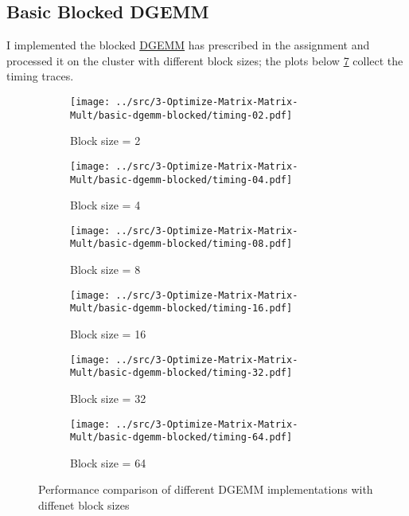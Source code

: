 
\subsection{Basic Blocked DGEMM}

I implemented the blocked \href{./../src/3-Optimize-Matrix-Matrix-Mult/dgemm-blocked.c}{DGEMM} has prescribed in the assignment and processed it on the cluster with different block sizes; the plots below \ref{fig:dgemm-performance} collect the timing traces.

\begin{figure}[h]
    \centering
    \begin{subfigure}[b]{0.48\textwidth}
        \centering
        \texttt{[image: ../src/3-Optimize-Matrix-Matrix-Mult/basic-dgemm-blocked/timing-02.pdf]}
        \caption{Block size = 2}
        \label{fig:timing-02}
    \end{subfigure}
    \hfill
    \begin{subfigure}[b]{0.48\textwidth}
        \centering
        \texttt{[image: ../src/3-Optimize-Matrix-Matrix-Mult/basic-dgemm-blocked/timing-04.pdf]}
        \caption{Block size = 4}
        \label{fig:timing-04}
    \end{subfigure}
    
    \vspace{1em}
    
    \begin{subfigure}[b]{0.48\textwidth}
        \centering
        \texttt{[image: ../src/3-Optimize-Matrix-Matrix-Mult/basic-dgemm-blocked/timing-08.pdf]}
        \caption{Block size = 8}
        \label{fig:timing-08}
    \end{subfigure}
    \hfill
    \begin{subfigure}[b]{0.48\textwidth}
        \centering
        \texttt{[image: ../src/3-Optimize-Matrix-Matrix-Mult/basic-dgemm-blocked/timing-16.pdf]}
        \caption{Block size = 16}
        \label{fig:timing-16}
    \end{subfigure}
    
    \vspace{1em}
    
    \begin{subfigure}[b]{0.48\textwidth}
        \centering
        \texttt{[image: ../src/3-Optimize-Matrix-Matrix-Mult/basic-dgemm-blocked/timing-32.pdf]}
        \caption{Block size = 32}
        \label{fig:timing-32}
    \end{subfigure}
    \hfill
    \begin{subfigure}[b]{0.48\textwidth}
        \centering
        \texttt{[image: ../src/3-Optimize-Matrix-Matrix-Mult/basic-dgemm-blocked/timing-64.pdf]}
        \caption{Block size = 64}
        \label{fig:timing-64}
    \end{subfigure}
    
    \caption{Performance comparison of different DGEMM implementations with diffenet block sizes}
    \label{fig:dgemm-performance}
\end{figure}

